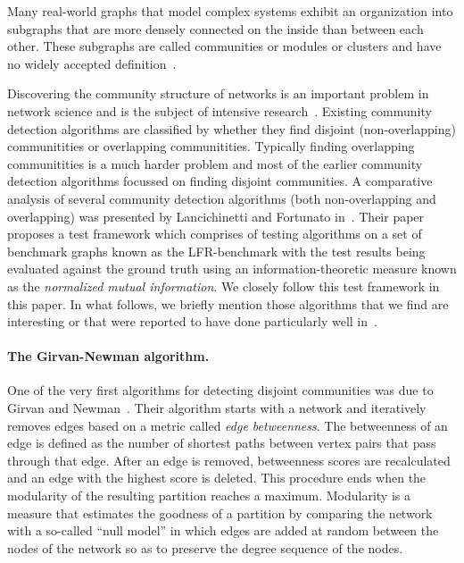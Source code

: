 Many real-world graphs that model complex systems 
exhibit an organization into subgraphs that are more 
densely connected on the inside than between each other. 
These subgraphs are called communities or modules or clusters 
and have no widely accepted definition~\cite{LF09, PDFV05}. 

Discovering the community structure of networks is an 
important problem in network science and is the subject 
of intensive research~\cite{GN02, GN04, CNM04, RCC04, DM04, PDFV05, NL07, 
BGLL08, RB08, RN09}. Existing community detection algorithms are 
classified by whether they find disjoint (non-overlapping) 
communitities or overlapping communitities. Typically finding 
overlapping communitities is a much harder problem and most of the 
earlier community detection algorithms focussed on finding disjoint 
communities. A comparative analysis of several community detection algorithms 
(both non-overlapping and overlapping) was presented by Lancichinetti and Fortunato 
in~\cite{LF09}. Their paper proposes a test framework 
which comprises of testing algorithms on a set of benchmark graphs 
known as the LFR-benchmark with the test results being evaluated against 
the ground truth using an information-theoretic measure known as the \emph{normalized 
mutual information}. We closely follow this test framework in this paper. 
In what follows, we briefly mention those algorithms that we find are interesting 
or that were reported to have done particularly well in~\cite{LF09}.

\paragraph{The Girvan-Newman algorithm.} 
One of the very first algorithms for detecting disjoint communities 
was due to Girvan and Newman~\cite{GN02, GN04}. Their 
algorithm starts with a network and iteratively removes edges based 
on a metric called \emph{edge betweenness}. The betweenness of an 
edge is defined as the number of shortest paths between vertex pairs 
that pass through that edge. After an edge is removed, betweenness 
scores are recalculated and an edge with the highest score is deleted. 
This procedure ends when the modularity of the resulting partition
reaches a maximum. Modularity is a measure that estimates the goodness 
of a partition by comparing the network with a so-called ``null model''
in which edges are added at random between the nodes of the network 
so as to preserve the degree sequence of the nodes. 

